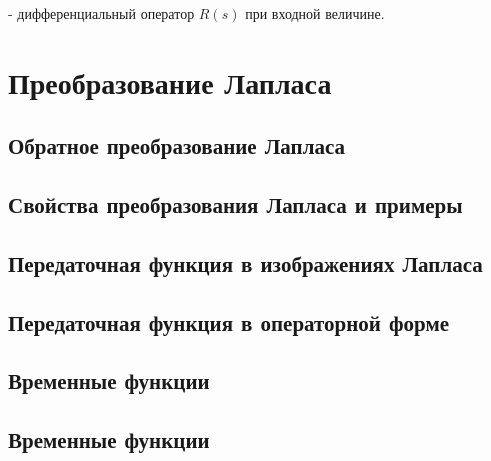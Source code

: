 \documentclass[TAU.tex]{subfiles}
\begin{document}
 - дифференциальный оператор $R(s)$ при входной величине.




\section{Преобразование Лапласа} %


\subsection{Обратное преобразование Лапласа} %


\subsection{Свойства преобразования Лапласа и примеры} %


\subsection{Передаточная функция в изображениях Лапласа} %


\subsection{Передаточная функция в операторной форме} %


\subsection{Временные функции} %


\subsection{Временные функции} %

\end{document}

